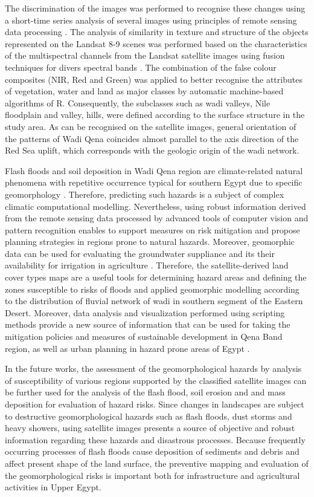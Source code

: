 \documentclass[information,article,submit,pdftex,moreauthors]{Definitions/mdpi}
\begin{document}
The discrimination of the images was performed to recognise these changes using a short-time series analysis of several images using principles of remote sensing data processing \cite{curran1985principles}. The analysis of similarity in texture and structure of the objects represented on the Landsat 8-9 scenes was performed based on the characteristics of the multispectral channels from the Landsat satellite images using fusion techniques for divers spectral bands \cite{4234117}. The combination of the false colour composites (NIR, Red and Green) was applied to better recognise the attributes of vegetation, water and land as major classes by automatic machine-based algorithms of R. Consequently, the subclasses such as wadi valleys, Nile floodplain and valley, hills, were defined according to the surface structure in the study area. As can be recognised on the satellite images, general orientation of the patterns of Wadi Qena coincides almost parallel to the axis direction of the Red Sea uplift, which corresponds with the geologic origin of the wadi network.

Flash floods and soil deposition in Wadi Qena region are climate-related natural phenomena with repetitive occurrence typical for southern Egypt due to specific geomorphology \cite{ElShamy}. Therefore, predicting such hazards is a subject of complex climatic computational modelling. Nevertheless, using robust information derived from the remote sensing data processed by advanced tools of computer vision and pattern recognition enables to support measures on risk mitigation and propose planning strategies in regions prone to natural hazards. Moreover, geomorphic data can be used for evaluating the groundwater suppliance \cite{Abdelkhalek2021,Abdelkareem} and its their availability for irrigation in agriculture \cite{Kamal2021}. Therefore, the satellite-derived land cover types maps are a useful tools for determining hazard areas and defining the zones susceptible to risks of floods and applied geomorphic modelling according to the distribution of fluvial network of wadi in southern segment of the Eastern Desert. Moreover, data analysis and visualization performed using scripting methods provide a new source of information that can be used for taking the mitigation policies and measures of sustainable development in Qena Band region, as well as urban planning in hazard prone areas of Egypt \cite{ABDELAAL2020103671}. 

In the future works, the assessment of the geomorphological hazards by analysis of susceptibility of various regions supported by the classified satellite images can be further used for the analysis of the flash flood, soil erosion and and mass deposition for evaluation of hazard risks. Since changes in landscapes are subject to destructive geomorphological hazards such as flash floods, dust storms and heavy showers, using satellite images presents a source of objective and robust information regarding these hazards and disastrous processes. Because frequently occurring processes of flash floods cause deposition of sediments and debris and affect present shape of the land surface, the preventive mapping and evaluation of the geomorphological risks is important both for infrastructure and agricultural activities in Upper Egypt. 
\end{document}

